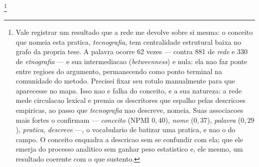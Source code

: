 %
%
%

\footnote{%
Vale registrar um resultado que a rede me devolve sobre si mesma: o
conceito que nomeia esta pratica, \emph{tecnografia}, tem centralidade
estrutural baixa no grafo da propria tese. A palavra ocorre 62 vezes ---
contra 881 de \emph{rede} e 330 de \emph{etnografia} --- e sua
intermediacao (\emph{betweenness}) e nula: ela nao faz ponte entre
regioes do argumento, permanecendo como ponto terminal na comunidade do
metodo. Precisei fixar seu rotulo manualmente para que aparecesse no
mapa. Isso nao e falha do conceito, e a sua natureza: a rede mede
circulacao lexical e premia os descritores que espalho pelas descricoes
empiricas, ao passo que \emph{tecnografia} nao descreve, nomeia. Suas
associacoes mais fortes o confirmam --- \emph{conceito} (NPMI $0{,}40$),
\emph{nome} ($0{,}37$), \emph{palavra} ($0{,}29$), \emph{pratica},
\emph{descreve} ---, o vocabulario de batizar uma pratica, e nao o do
campo. O conceito enquadra a descricao sem se confundir com ela; que ele
emerja do processo analitico sem ganhar peso estatistico e, ele mesmo,
um resultado coerente com o que sustento.%
}

